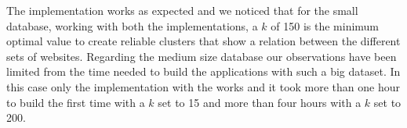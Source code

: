 The implementation works as expected and we noticed that for the small database, working with both the implementations, a $k$ of 150 is the minimum optimal value to create reliable clusters that show a relation between the different sets of websites. Regarding the medium size database our observations have been limited from the time needed to build the applications with such a big dataset. In this case only the implementation with the  works and it took more than one hour to build the first time with a $k$ set to 15 and more than four hours with a $k$ set to 200. 
